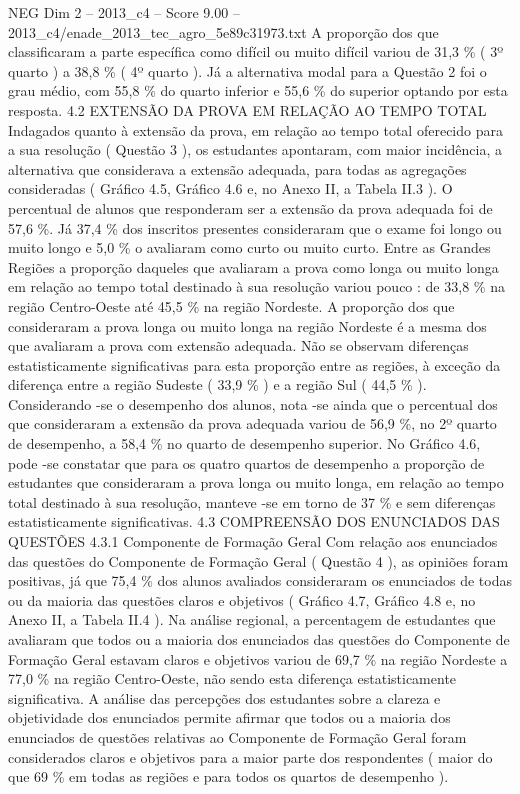 \begin{textsample}{NEG Dim 2 – 2013\_c4 – Score 9.00 – 2013\_c4/enade\_2013\_tec\_agro\_5e89c31973.txt}
A proporção dos que classificaram a parte específica como difícil ou muito difícil variou de 31,3 \% ( 3º quarto ) a 38,8 \% ( 4º quarto ).
Já a alternativa modal para a Questão 2 foi o grau médio, com 55,8 \% do quarto inferior e 55,6 \% do superior optando por esta resposta. 4.2 EXTENSÃO DA PROVA EM RELAÇÃO AO TEMPO TOTAL Indagados quanto à extensão da prova, em relação ao tempo total oferecido para a sua resolução ( Questão 3 ), os estudantes apontaram, com maior incidência, a alternativa que considerava a extensão adequada, para todas as agregações consideradas ( Gráfico 4.5, Gráfico 4.6 e, no Anexo II, a Tabela II.3 ).
O percentual de alunos que responderam ser a extensão da prova adequada foi de 57,6 \%.
Já 37,4 \% dos inscritos presentes consideraram que o exame foi longo ou muito longo e 5,0 \% o avaliaram como curto ou muito curto.
Entre as Grandes Regiões a proporção daqueles que avaliaram a prova como longa ou muito longa em relação ao tempo total destinado à sua resolução variou pouco : de 33,8 \% na região Centro-Oeste até 45,5 \% na região Nordeste.
A proporção dos que consideraram a prova longa ou muito longa na região Nordeste é a mesma dos que avaliaram a prova com extensão adequada.
Não se observam diferenças estatisticamente significativas para esta proporção entre as regiões, à exceção da diferença entre a região Sudeste ( 33,9 \% ) e a região Sul ( 44,5 \% ).
Considerando -se o desempenho dos alunos, nota -se ainda que o percentual dos que consideraram a extensão da prova adequada variou de 56,9 \%, no 2º quarto de desempenho, a 58,4 \% no quarto de desempenho superior.
No Gráfico 4.6, pode -se constatar que para os quatro quartos de desempenho a proporção de estudantes que consideraram a prova longa ou muito longa, em relação ao tempo total destinado à sua resolução, manteve -se em torno de 37 \% e sem diferenças estatisticamente significativas. 4.3 COMPREENSÃO DOS ENUNCIADOS DAS QUESTÕES 4.3.1 Componente de Formação Geral Com relação aos enunciados das questões do Componente de Formação Geral ( Questão 4 ), as opiniões foram positivas, já que 75,4 \% dos alunos avaliados consideraram os enunciados de todas ou da maioria das questões claros e objetivos ( Gráfico 4.7, Gráfico 4.8 e, no Anexo II, a Tabela II.4 ).
Na análise regional, a percentagem de estudantes que avaliaram que todos ou a maioria dos enunciados das questões do Componente de Formação Geral estavam claros e objetivos variou de 69,7 \% na região Nordeste a 77,0 \% na região Centro-Oeste, não sendo esta diferença estatisticamente significativa.
A análise das percepções dos estudantes sobre a clareza e objetividade dos enunciados permite afirmar que todos ou a maioria dos enunciados de questões relativas ao Componente de Formação Geral foram considerados claros e objetivos para a maior parte dos respondentes ( maior do que 69 \% em todas as regiões e para todos os quartos de desempenho ).

\end{textsample}
